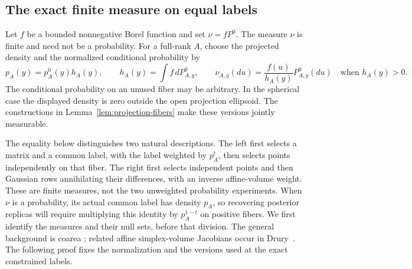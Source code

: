 \subsection{The exact finite measure on equal labels}

Let $f$ be a bounded nonnegative Borel function and set $\nu=fP^0$.
The measure $\nu$ is finite and need not be a probability. For a full-rank
$A$, choose the projected density and the normalized conditional probability
by
\begin{equation}\label{eq:finite-tilt}
 p_A(y)=p_A^0(y)h_A(y),\qquad
 h_A(y)=\int f\,dP^0_{A,y},\qquad
 \nu_{A,y}(du)=\frac{f(u)}{h_A(y)}P^0_{A,y}(du)
 \quad\text{when }h_A(y)>0.
\end{equation}
The conditional probability on an unused fiber may be arbitrary. In the
spherical case the displayed density is zero outside the open projection
ellipsoid. The constructions in Lemma~\ref{lem:projection-fibers} make these
versions jointly measurable.

The equality below distinguishes two natural descriptions. The left first
selects a matrix and a common label, with the label weighted by $p_A^t$,
then selects points independently on that fiber. The right first selects
independent points and then Gaussian rows annihilating their differences,
with an inverse affine-volume weight. These are finite measures, not the
two unweighted probability experiments. When $\nu$ is a probability, its
actual common label has density $p_A$, so recovering posterior replicas
will require multiplying this identity by $p_A^{1-t}$ on positive fibers.
We first identify the measures and their null sets, before that division.
The general background is coarea
\cite[Theorem 3.1]{Federer1959}; related affine simplex-volume Jacobians
occur in Drury~\cite[Lemma 1]{Drury1984}. The following proof fixes the
normalization and the versions used at the exact constrained labels.

